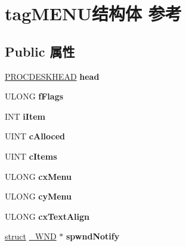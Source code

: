 \hypertarget{structtag_m_e_n_u}{}\section{tag\+M\+E\+N\+U结构体 参考}
\label{structtag_m_e_n_u}
\subsection*{Public 属性}
\begin{DoxyCompactItemize}
\item 
\mbox{\label{structtag_m_e_n_u_a7cbf961ad4fc63dfbcfb46b2d96e17c1}} 
\hyperlink{struct___p_r_o_c_d_e_s_k_h_e_a_d}{P\+R\+O\+C\+D\+E\+S\+K\+H\+E\+AD} {\bfseries head}
\item 
\mbox{\label{structtag_m_e_n_u_a0364584a672ecf5f971b1b5e8a2bc7a9}} 
U\+L\+O\+NG {\bfseries f\+Flags}
\item 
\mbox{\label{structtag_m_e_n_u_a810ee28aa0705669e22cb7e43447b31a}} 
I\+NT {\bfseries i\+Item}
\item 
\mbox{\label{structtag_m_e_n_u_ac40ab00dcb93ae4bf782d81e4b00add7}} 
U\+I\+NT {\bfseries c\+Alloced}
\item 
\mbox{\label{structtag_m_e_n_u_a845ae5a4aba7a8e5a05df8684e52626a}} 
U\+I\+NT {\bfseries c\+Items}
\item 
\mbox{\label{structtag_m_e_n_u_ad1d371da381f25275f6d249a4bf93776}} 
U\+L\+O\+NG {\bfseries cx\+Menu}
\item 
\mbox{\label{structtag_m_e_n_u_a3b4379128a587715a88133fb8b3dd413}} 
U\+L\+O\+NG {\bfseries cy\+Menu}
\item 
\mbox{\label{structtag_m_e_n_u_afa849cc5a98f76828639f25f3aa12471}} 
U\+L\+O\+NG {\bfseries cx\+Text\+Align}
\item 
\mbox{\label{structtag_m_e_n_u_a6cb82dfcc8266689193d7750ec855376}} 
\hyperlink{interfacestruct}{struct} \hyperlink{struct___w_n_d}{\+\_\+\+W\+ND} $\ast$ {\bfseries spwnd\+Notify}

\end{DoxyCompactItemize}
